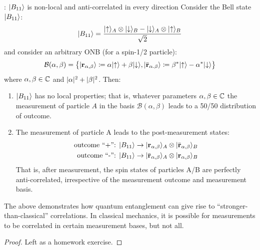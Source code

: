 \begin{propbox}{: $\lvert B_{11} \rangle$ is non-local and anti-correlated in every direction}
    Consider the Bell state $\lvert B_{11} \rangle$:
    \begin{equation}
        \lvert B_{11} \rangle = \frac{\lvert \uparrow \rangle_A \otimes \lvert \downarrow \rangle_B - \lvert \downarrow \rangle_A \otimes \lvert \uparrow \rangle_B}{\sqrt{2}}
    \end{equation}
    and consider an arbitrary ONB (for a spin-1/2 particle):
    \begin{equation}
        \mathcal{B}(\alpha, \beta) = \set{\lvert \ensuremath{\mathbf{r}}_{\alpha, \beta} \rangle \coloneqq \alpha\lvert \uparrow \rangle + \beta\lvert \downarrow \rangle, \lvert \bar{\ensuremath{\mathbf{r}}}_{\alpha. \beta} \rangle \coloneqq \beta^*\lvert \uparrow \rangle - \alpha^*\lvert \downarrow \rangle}
    \end{equation}
    where $\alpha, \beta \in \mathbb{C}$ and $\lvert \alpha \rvert^2 + \lvert \beta \rvert^2$. Then:
    \begin{enumerate}
        \item $\lvert B_{11} \rangle$ has no local properties; that is, whatever parameters $\alpha, \beta \in \mathbb{C}$ the measurement of particle $A$ in the basis $\mathcal{B}(\alpha, \beta)$ leads to a 50/50 distribution of outcome.
        \item The measurement of particle A leads to the post-measurement states:
        \begin{equation}
            \begin{split}
                \text{outcome ``+'': } \lvert B_{11} \rangle &\to \lvert \mathbf{r}_{\alpha, \beta} \rangle_A \otimes \lvert \bar{\mathbf{r}}_{\alpha, \beta} \rangle_B
                \\ \text{outcome  ``-'': } \lvert B_{11} \rangle &\to \lvert \bar{\mathbf{r}}_{\alpha, \beta} \rangle_A \otimes \lvert \mathbf{r}_{\alpha, \beta} \rangle_B
            \end{split}
        \end{equation}
        That is, after measurement, the spin states of particles A/B are perfectly anti-correlated, irrespective of the measurement outcome and measurement basis.
    \end{enumerate} 
\end{propbox}
The above demonstrates how quantum entanglement can give rise to ``stronger-than-classical'' correlations. In classical mechanics, it is possible for measurements to be correlated in certain measurement bases, but not all.

\begin{proof}
    Left as a homework exercise.
\end{proof}

